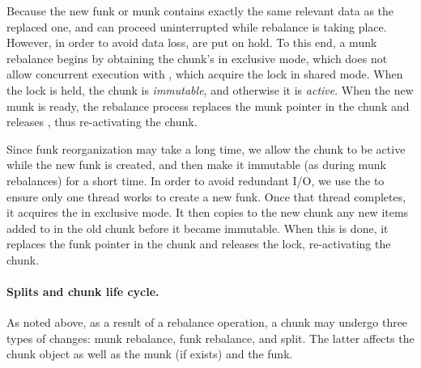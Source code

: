 Because the new funk or munk contains exactly the same relevant data as the replaced one, 
 and  can proceed uninterrupted while rebalance is taking place. 
However, in order to avoid data loss,  are put on hold. 
To this end, a munk rebalance begins by obtaining the chunk's  in exclusive mode,
which does not allow concurrent execution with  , which acquire the lock in shared mode.
When the lock is held, the chunk is \emph{immutable}, and otherwise it is \emph{active}. 
When the new munk is ready, the rebalance process replaces the munk pointer in the chunk and releases , thus 
re-activating the chunk.

Since funk reorganization may take a long time, we allow the chunk to be active while the new funk is created,
and then make it immutable (as during munk rebalances) for a short time. In order to avoid redundant I/O, 
we use the  to ensure only one thread works to create a new funk.  Once that thread
completes, it acquires the  in exclusive mode.
It then copies to the new chunk any new items added to   in the old chunk before it became immutable. 
When this is done, it replaces the funk pointer in the chunk and releases the lock, re-activating the chunk.

\paragraph{Splits and chunk life cycle.}

As noted above, as a result of a rebalance operation, a chunk may undergo three types of changes: munk rebalance, funk rebalance, and split. 
The latter affects the chunk object as well as the munk (if exists) and the funk.

